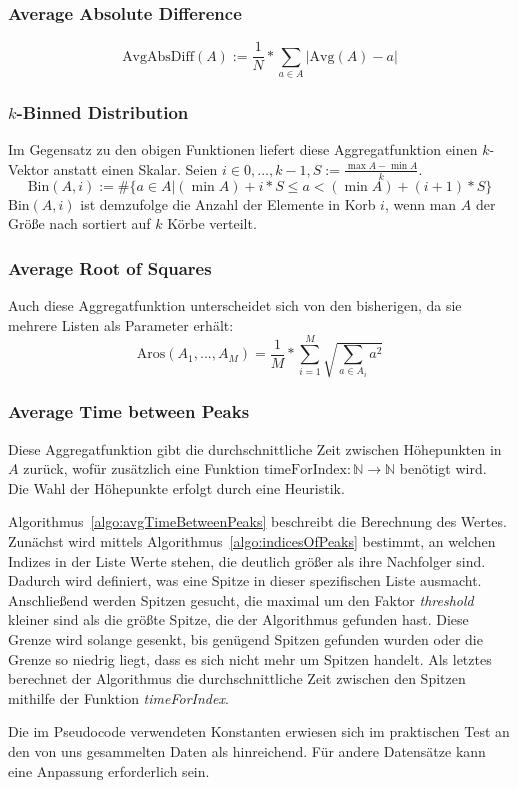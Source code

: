 \subsubsection{Average Absolute Difference}
\[
\text{AvgAbsDiff}(A) := \frac{1}{N} * \sum_{a \in A} |\text{Avg}(A) - a|
\]
\subsubsection{$k$-Binned Distribution}
Im Gegensatz zu den obigen Funktionen liefert diese Aggregatfunktion einen $k$-Vektor anstatt einen Skalar. Seien $i \in {0, ..., k - 1}, S := \frac{\max A - \min A}{k}$.
\[
\text{Bin}(A, i) := \#\{a \in A | (\min A) + i * S \leq a < (\min A) + (i + 1) * S\}
\]
$\text{Bin}(A, i)$ ist demzufolge die Anzahl der Elemente in Korb $i$, wenn man $A$ der Größe nach sortiert auf $k$ Körbe verteilt.
\subsubsection{Average Root of Squares}
Auch diese Aggregatfunktion unterscheidet sich von den bisherigen, da sie mehrere Listen als Parameter erhält:
\[
\text{Aros}(A_1, ..., A_M) = \frac{1}{M} * \sum_{i = 1}^{M} \sqrt{\sum_{a \in A_i} a^2}
\]
\subsubsection{Average Time between Peaks}
Diese Aggregatfunktion gibt die durchschnittliche Zeit zwischen Höhepunkten in $A$ zurück, wofür zusätzlich eine Funktion $\text{timeForIndex}: \mathbb{N} \to \mathbb{N}$ benötigt wird. Die Wahl der Höhepunkte erfolgt durch eine Heuristik. 

Algorithmus~\ref{algo:avgTimeBetweenPeaks} beschreibt die Berechnung des Wertes. Zunächst wird mittels Algorithmus~\ref{algo:indicesOfPeaks} bestimmt, an welchen Indizes in der Liste Werte stehen, die deutlich größer als ihre Nachfolger sind. Dadurch wird definiert, was eine Spitze in dieser spezifischen Liste ausmacht. Anschließend werden Spitzen gesucht, die maximal um den Faktor \textit{threshold} kleiner sind als die größte Spitze, die der Algorithmus gefunden hast. Diese Grenze wird solange gesenkt, bis genügend Spitzen gefunden wurden oder die Grenze so niedrig liegt, dass es sich nicht mehr um Spitzen handelt. Als letztes berechnet der Algorithmus die durchschnittliche Zeit zwischen den Spitzen mithilfe der Funktion \textit{timeForIndex}.

Die im Pseudocode verwendeten Konstanten erwiesen sich im praktischen Test an den von uns gesammelten Daten als hinreichend. Für andere Datensätze kann eine Anpassung erforderlich sein.

